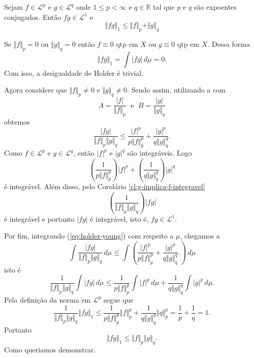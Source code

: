 \documentclass[a4paper, 11pt]{book}
\theoremstyle{definition}
\newcommand{\bR}{\mathbb{R}}
\newcommand{\cL}{\mathcal{L}}
\begin{document}
\begin{tbox} \label{thm:desigualdade-de-holder}
    Sejam $f \in \cL^p$ e $g \in \cL^q$ onde $1 \leqslant p < \infty$ e $q \in \bR$ tal que $p$ e $q$ são expoentes conjugados.
    Então $fg \in \cL^1$ e
    \[
        \Vert fg \Vert_1 \leqslant \Vert f \Vert_p + \Vert g \Vert_q
    \]
\end{tbox}
\begin{prf}
    Se $\Vert f \Vert_p = 0$ ou $\Vert g \Vert_q = 0$ então $f \equiv 0$ qtp em $X$ ou $g \equiv 0$ qtp em $X$. Dessa forma
    \[
        \Vert fg \Vert_1 = \int |fg| \,d\mu = 0.
    \]
    Com isso, a desigualdade de Holder é trivial.

    Agora considere que $\Vert f \Vert_p \neq 0$ e $\Vert g \Vert_q \neq 0$. Sendo assim, utilizando a  com
    \[
        A = \frac{|f|}{\Vert f \Vert_p} \;\text{ e }\; B = \frac{|g|}{\Vert g \Vert_q}
    \]
    obtemos
    \begin{equation} \label{eq:holder-young}
        \frac{|fg|}{\Vert f \Vert_p \Vert g \Vert_q}\leqslant \frac{|f|^p}{p \Vert f \Vert_p^p} + \frac{|g|^p}{q \Vert g \Vert_q^q}.
    \end{equation}
    Como $f \in \cL^p$ e $g \in \cL^q$, então $|f|^p$ e $|g|^q$ são integráveis.
    Logo
    \[
        \left( \frac{1}{p \Vert f \Vert_p^p} \right) |f|^p + \left( \frac{1}{q \Vert g \Vert_q^q} \right) |g|^q
    \]
    é integrável.
    Além disso, pelo Corolário \ref{cl:g-implica-f-integravel}
    \[
        \left( \frac{1}{\Vert f \Vert_p \Vert g \Vert_q} \right) |fg|
    \]
    é integrável e portanto $|fg|$ é integrável, isto é, $fg \in \cL^1$.

    Por fim, integrando (\ref{eq:holder-young}) com respeito a $\mu$, chegamos a
    \[
        \int \frac{|fg|}{\Vert f \Vert_p \Vert g \Vert_q} \,d\mu \leqslant \int \left( \frac{|f|^p}{p \Vert f \Vert_p^p} + \frac{|g|^p}{q \Vert g \Vert_q^q}. \right) \, d\mu
    \]
    isto é
    \[
        \frac{1}{\Vert f \Vert_p \Vert g \Vert_q} \int |fg| \,d\mu \leqslant \frac{1}{p \Vert f \Vert_p^p} \int |f|^p \,d\mu + \frac{1}{q \Vert g \Vert_q^q}\int |g|^p \,d\mu.
    \]
    Pela definição da norma em $\cL^p$ segue que
    \[
        \frac{1}{\Vert f \Vert_p \Vert g \Vert_q} \Vert fg \Vert_1 \leqslant \frac{1}{p \Vert f \Vert_p^p} \Vert f \Vert_p^p + \frac{1}{q \Vert g \Vert_q^q} \Vert q \Vert_p^p = \frac{1}{p} + \frac{1}{q} = 1.
    \]
    Portanto
    \[
        \Vert fg \Vert_1 \leqslant \Vert f \Vert_p \Vert g \Vert_q.
    \]
    Como queriamos demonstrar.
\end{prf}
\end{document}
